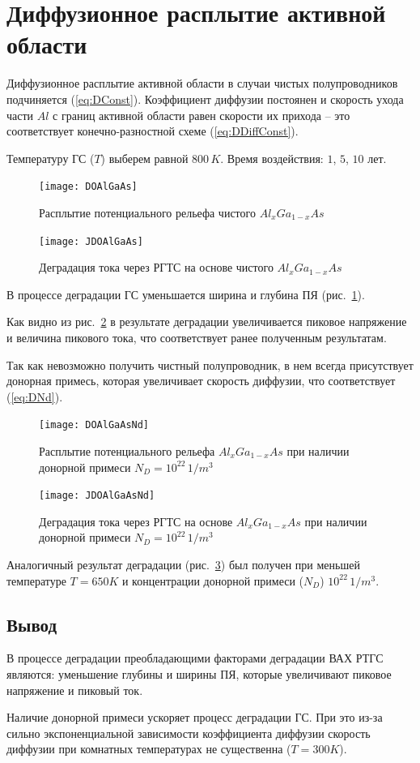 \section{Диффузионное расплытие активной области}
Диффузионное расплытие активной области в случаи чистых полупроводников подчиняется (\ref{eq:DConst}). Коэффициент диффузии постоянен и скорость ухода части $Al$ с границ активной области равен скорости их прихода -- это соответствует конечно-разностной схеме (\ref{eq:DDiffConst}).

Температуру ГС ($T$) выберем равной $800\,K$. Время воздействия: $1$, $5$, $10$ лет.

\begin{figure}[h!]
	\centering
	\texttt{[image: DOAlGaAs]}
	\caption{Расплытие потенциального рельефа чистого $Al_{x}Ga_{1−x}As$}
	\label{fig:DOAlGaAs}
\end{figure}

\begin{figure}[h!]
	\centering
	\texttt{[image: JDOAlGaAs]}
	\caption{Деградация тока через РГТС на основе чистого $Al_{x}Ga_{1−x}As$}
	\label{fig:JDOAlGaAs}
\end{figure}

В процессе деградации ГС уменьшается ширина и глубина ПЯ (рис.~\ref{fig:DOAlGaAs}).

Как видно из рис.~\ref{fig:JDOAlGaAs} в результате деградации увеличивается пиковое напряжение и величина пикового тока, что соответствует ранее полученным результатам.

Так как невозможно получить чистный полупроводник, в нем всегда присутствует донорная примесь, которая увеличивает скорость диффузии, что соответствует (\ref{eq:DNd}).

\begin{figure}[h!]
	\centering
	\texttt{[image: DOAlGaAsNd]}
	\caption{Расплытие потенциального рельефа $Al_{x}Ga_{1−x}As$ при наличии донорной примеси $N_{D}=10^{22}\, 1/m^{3}$} 
	\label{fig:DOAlGaAsNd}
\end{figure}

\begin{figure}[h!]
	\centering
	\texttt{[image: JDOAlGaAsNd]}
	\caption{Деградация тока через РГТС на основе $Al_{x}Ga_{1−x}As$ при наличии донорной примеси $N_{D}=10^{22}\, 1/m^{3}$}
	\label{fig:JDOAlGaAsNd}
\end{figure}


Аналогичный результат деградации (рис.~\ref{fig:DOAlGaAsNd}) был получен при меньшей температуре $T = 650K$ и концентрации донорной примеси ($N_{D}$) $10^{22}\, 1/m^{3}$.

\subsection{Вывод}
В процессе деградации преобладающими факторами деградации ВАХ РТГС являются: уменьшение глубины и ширины ПЯ, которые увеличивают пиковое напряжение и пиковый ток.

Наличие донорной примеси ускоряет процесс деградации ГС. При это из-за сильно экспоненциальной зависимости коэффициента диффузии скорость диффузии при комнатных температурах не существенна ($T = 300K$).